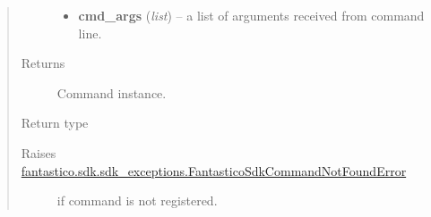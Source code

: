 \documentclass[letterpaper,10pt,english]{sphinxmanual}
\begin{document}
\begin{fulllineitems}
\begin{fulllineitems}
\begin{quote}
\begin{description}
\begin{itemize}
\item {} 
\textbf{cmd\_args} (\emph{list}) -- a list of arguments received from command line.

\end{itemize}

\item[{Returns}] \leavevmode
Command instance.

\item[{Return type}] \leavevmode
{\hyperref[features/sdk:fantastico.sdk.sdk_core.SdkCommand]{}}

\item[{Raises {\hyperref[features/sdk:fantastico.sdk.sdk_exceptions.FantasticoSdkCommandNotFoundError]{fantastico.sdk.sdk\_exceptions.FantasticoSdkCommandNotFoundError}}}] \leavevmode
if command is not registered.

\end{description}\end{quote}

\end{fulllineitems}


\end{fulllineitems}

\end{document}
